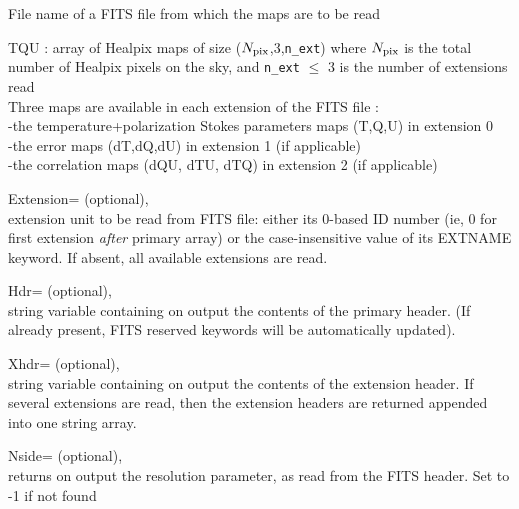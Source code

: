 \begin{qualifiers}
  \begin{qulist}{} %
 	\item[{File}] 
          name of a FITS file from which the maps are to be read

   \item[{TQU}] : 
array of Healpix maps of size ($N_{\mathrm{pix}}$,3,{\tt n\_ext}) where $N_{\mathrm{pix}}$ is the total
   number of Healpix pixels on the sky, and {\tt n\_ext} $\le$ 3 is
   the number of extensions read\\
     Three maps are available in each extension of the FITS file : \\
      -the temperature+polarization Stokes parameters maps (T,Q,U) in
   extension 0 \\
      -the error maps (dT,dQ,dU) in extension 1 (if applicable)\\
      -the correlation maps (dQU, dTU, dTQ) in extension 2 (if applicable)

       \item[{Extension=}] 
		(optional), \\
	extension unit to be read from FITS file: 
 either its 0-based ID number (ie, 0 for first extension {\em after} primary array) 
 or the case-insensitive value of its EXTNAME keyword.
	If absent, all available extensions are read.

       \item[{Hdr=}] 
		  (optional), \\
		string variable containing on output  the contents of the primary header. (If already present, FITS reserved
		  keywords will be automatically updated).

       \item[{Xhdr=}] 
		  (optional), \\
		string variable containing on output the contents of the
		  extension header. If 
                  several extensions are read, then the extension 
                  headers are returned appended into one string array.

	 \item[{Nside=}] 
		(optional), \\
	        returns on output the \healpix resolution parameter, as read
		from the FITS header. Set to -1 if not found


\end{qulist}
\end{qualifiers}
